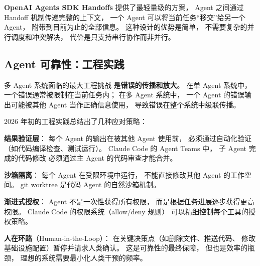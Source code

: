 \textbf{OpenAI Agents SDK Handoffs}
提供了最轻量级的方案，
Agent 之间通过 Handoff 机制传递完整的上下文，
一个 Agent 可以将当前任务“移交”给另一个 Agent，
附带到目前为止的全部信息。
这种设计的优势是简单，
不需要复杂的并行调度和冲突解决，
代价是只支持串行协作而非并行。

\subsection{Agent 可靠性：工程实践}

多 Agent 系统面临的最大工程挑战
是\textbf{错误的传播和放大}。
在单 Agent 系统中，
一个错误通常被限制在当前任务内；
在多 Agent 系统中，
一个 Agent 的错误输出可能被其他 Agent
当作正确信息使用，
导致错误在整个系统中级联传播。

2026 年初的工程实践总结出了几种应对策略：

\textbf{结果验证层}：
每个 Agent 的输出在被其他 Agent 使用前，
必须通过自动化验证（如代码编译检查、测试运行）。
Claude Code 的 Agent Teams 中，
子 Agent 完成的代码修改
必须通过主 Agent 的代码审查才能合并。

\textbf{沙箱隔离}：
每个 Agent 在受限环境中运行，
不能直接修改其他 Agent 的工作空间。
git worktree 是代码 Agent 的自然沙箱机制。

\textbf{渐进式授权}：
Agent 不是一次性获得所有权限，
而是根据任务进展逐步获得更高权限。
Claude Code 的权限系统（allow/deny 规则）
可以精细控制每个工具的授权策略。

\textbf{人在环路}（Human-in-the-Loop）：
在关键决策点（如删除文件、推送代码、
修改基础设施配置）暂停并请求人类确认。
这是可靠性的最终保障，
但也是效率的瓶颈，
理想的系统需要最小化人类干预的频率。

